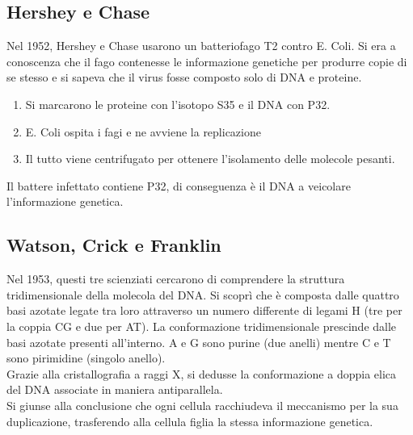     \subsection{Hershey e Chase}
        Nel 1952, Hershey e Chase usarono un batteriofago T2 contro E. Coli. Si era a conoscenza che il fago contenesse le informazione genetiche per produrre copie di se stesso e si sapeva che il virus fosse composto solo di DNA e proteine.
        \begin{enumerate}
            \item Si marcarono le proteine con l'isotopo S35 e il DNA con P32. 
            \item E. Coli ospita i fagi e ne avviene la replicazione
            \item Il tutto viene centrifugato per ottenere l'isolamento delle molecole pesanti.
        \end{enumerate}
        Il battere infettato contiene P32, di conseguenza è il DNA a veicolare l'informazione genetica.
    
    \subsection{Watson, Crick e Franklin}
        Nel 1953, questi tre scienziati cercarono di comprendere la struttura tridimensionale della molecola del DNA. Si scoprì che è composta dalle quattro basi azotate legate tra loro attraverso un numero differente di legami H (tre per la coppia CG e due per AT). 
        La conformazione tridimensionale prescinde dalle basi azotate presenti all'interno. A e G sono purine (due anelli) mentre C e T sono pirimidine (singolo anello).\\
        Grazie alla cristallografia a raggi X, si dedusse la conformazione a doppia elica del DNA associate in maniera antiparallela.\\
        Si giunse alla conclusione che ogni cellula racchiudeva il meccanismo per la sua duplicazione, trasferendo alla cellula figlia la stessa informazione genetica.
    
